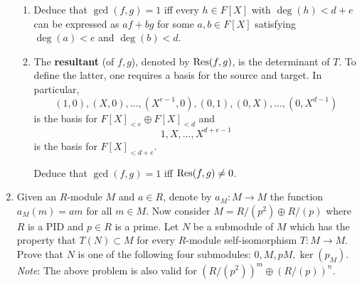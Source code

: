 \documentclass[../psets.tex]{subfiles}
\begin{document}
\begin{enumerate}
    \begin{enumerate}
        \item Deduce that $\gcd(f,g)=1$ iff every $h\in F[X]$ with $\deg(h)<d+e$ can be expressed as $af+bg$ for some $a,b\in F[X]$ satisfying $\deg(a)<e$ and $\deg(b)<d$.
        \item The \textbf{resultant} (of $f,g$), denoted by $\operatorname{Res}(f,g)$, is the determinant of $T$. To define the latter, one requires a basis for the source and target. In particular,
        \begin{equation*}
            (1,0),(X,0),\dots,(X^{e-1},0),(0,1),(0,X),\dots,(0,X^{d-1})
        \end{equation*}
        is the basis for $F[X]_{<e}\oplus F[X]_{<d}$ and
        \begin{equation*}
            1,X,\dots,X^{d+e-1}
        \end{equation*}
        is the basis for $F[X]_{<d+e}$.\par
        Deduce that $\gcd(f,g)=1$ iff $\operatorname{Res}(f,g)\neq 0$.
    \end{enumerate}
    \item Given an $R$-module $M$ and $a\in R$, denote by $a_M:M\to M$ the function $a_M(m)=am$ for all $m\in M$. Now consider $M=R/(p^2)\oplus R/(p)$ where $R$ is a PID and $p\in R$ is a prime. Let $N$ be a submodule of $M$ which has the property that $T(N)\subset M$ for every $R$-module self-isomorphism $T:M\to M$. Prove that $N$ is one of the following four submodules: $0,M,pM,\ker(p_M)$. \emph{Note}: The above problem is also valid for $(R/(p^2))^m\oplus(R/(p))^n$.
\end{enumerate}
\end{document}
